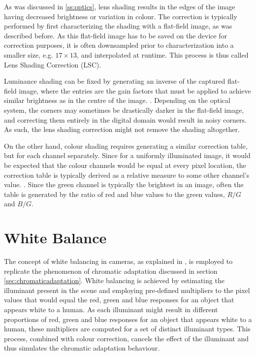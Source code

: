 As was discussed in \ref{ss:optics}, lens shading results in the edges of the image having decreased brightness or variation in colour. The correction is typically performed by first characterizing the shading with a flat-field image, as was described before. As this flat-field image has to be saved on the device for correction purposes, it is often downsampled prior to characterization into a smaller size, e.g. $17 \times 13$, and interpolated at runtime. This process is thus called Lens Shading Correction (LSC).

Luminance shading can be fixed by generating an inverse of the captured flat-field image, where the entries are the gain factors that must be applied to achieve similar brightness as in the centre of the image. \cite[286-287]{nakamura}. Depending on the optical system, the corners may sometimes be drastically darker in the flat-field image, and correcting them entirely in the digital domain would result in noisy corners. As such, the lens shading correction might not remove the shading altogether.

On the other hand, colour shading requires generating a similar correction table, but for each channel separately. Since for a uniformly illuminated image, it would be expected that the colour channels would be equal at every pixel location, the correction table is typically derived as a relative measure to some other channel's value. \cite[286-287]{nakamura}. Since the green channel is typically the brightest in an image, often the table is generated by the ratio of red and blue values to the green values, $R/G$ and $B/G$.

\section{White Balance}

The concept of white balancing in cameras, as explained in \cite[ch.~4.6]{rowlands2020physics}, is employed to replicate the phenomenon of chromatic adaptation discussed in section \ref{sec:chromaticadaptation}. White balancing is achieved by estimating the illuminant present in the scene and employing pre-defined multipliers to the pixel values that would equal the red, green and blue responses for an object that appears white to a human. As each illuminant might result in different proportions of red, green and blue responses for an object that appears white to a human, these multipliers are computed for a set of distinct illuminant types. This process, combined with colour correction, cancels the effect of the illuminant and thus simulates the chromatic adaptation behaviour. 

